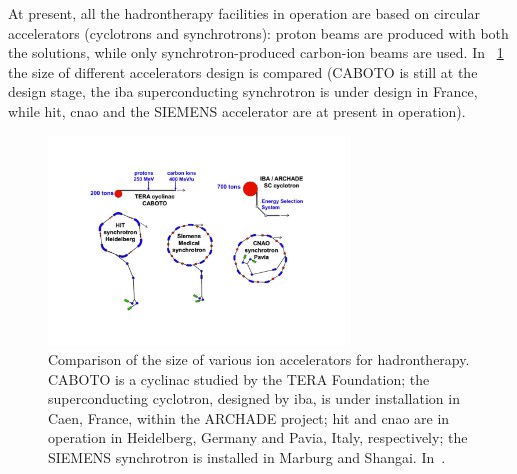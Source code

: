At present, all the hadrontherapy facilities in operation are based on circular accelerators (cyclotrons and synchrotrons): proton beams are produced with both the solutions, while only synchrotron-produced carbon-ion beams are used. In \figurename~\ref{chap1::fig::acceleratorSize} the size of different accelerators design is compared (CABOTO is still at the design stage, the \gls{iba} superconducting synchrotron is under design in France, while \gls{hit}, \gls{cnao} and the SIEMENS accelerator are at present in operation).

\begin{figure}[!htbp]
\centering
\includegraphics[width=0.7\textwidth]{03_GraphicFiles/chapter1_Introduction/acceleratorSize.pdf}
\caption{Comparison of the size of various ion accelerators for hadrontherapy. CABOTO is a cyclinac studied by the TERA Foundation; the superconducting cyclotron, designed by \gls{iba}, is under installation in Caen, France, within the ARCHADE project; \gls{hit} and \gls{cnao} are in operation in Heidelberg, Germany and Pavia, Italy, respectively; the SIEMENS synchrotron is installed in Marburg and Shangai. In~\cite{Amaldi2010}.}
\label{chap1::fig::acceleratorSize}
\end{figure} 

